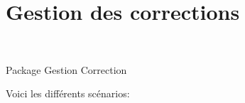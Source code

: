 \section{Gestion des corrections}

\begin{center}
\\
\par{Package Gestion Correction}
\end{center}

Voici les diff{\'e}rents sc{\'e}narios:\\

